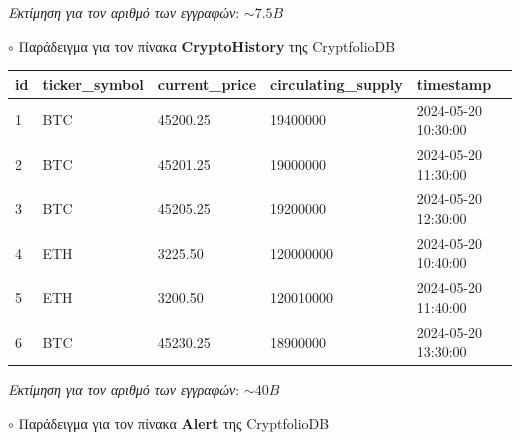 \documentclass[a4paper,12pt]{article}
\begin{document}
\begin{flushright}
\textit{Εκτίμηση για τον αριθμό των εγγραφών}: $\sim7.5B$
\end{flushright}


\bigskip
\noindent $\circ$ Παράδειγμα για τον πίνακα \textbf{CryptoHistory} της CryptfolioDB

\noindent 
\begin{tabular}{|l|l|l|l|l|}
    \hline
    \textbf{id} & \textbf{ticker\_symbol} & \textbf{current\_price} & \textbf{circulating\_supply} & \textbf{timestamp} \\
    \hline
    1 & BTC & 45200.25 & 19400000 & 2024-05-20 10:30:00 \\
    \hline
    2 & BTC & 45201.25 & 19000000 & 2024-05-20 11:30:00 \\
    \hline
    3 & BTC & 45205.25 & 19200000 & 2024-05-20 12:30:00 \\
    \hline
    4 & ETH & 3225.50 & 120000000 & 2024-05-20 10:40:00 \\
    \hline
    5 & ETH & 3200.50 & 120010000 & 2024-05-20 11:40:00 \\
    \hline
    6 & BTC & 45230.25 & 18900000 & 2024-05-20 13:30:00 \\
    \hline
\end{tabular}

\begin{flushright}
\textit{Εκτίμηση για τον αριθμό των εγγραφών}: $\sim40B$
\end{flushright}

\bigskip
\noindent $\circ$ Παράδειγμα για τον πίνακα \textbf{Alert} της CryptfolioDB
\end{document}
